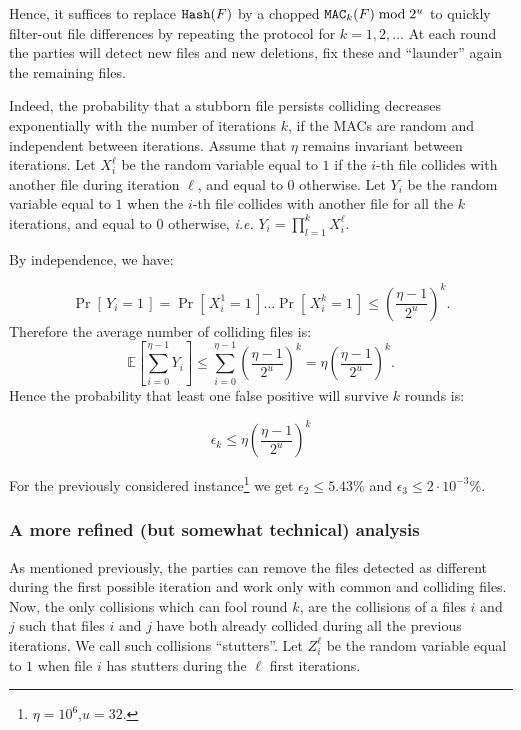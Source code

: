 \documentclass[11pt]{llncs}
\newcommand{\Prob}[1]{{\Pr\left[\,{#1}\,\right]}}
\newcommand{\EE}[1]{{\mathbb{E}\left[{#1}\right]}}
\begin{document}
Hence, it suffices to replace $\mbox{{\tt Hash}}(F)$ by a chopped $\mbox{{\tt MAC}}_k(F) \bmod 2^u$ to quickly filter-out file differences by repeating the protocol for $k=1,2,\ldots$ At each round the parties will detect new files and new deletions, fix these and ``launder'' again the remaining files.\smallskip

Indeed, the probability that a stubborn file persists colliding decreases exponentially with the number of iterations $k$, if the MACs are random and independent between iterations.
Assume that $\eta$ remains invariant between iterations.
Let $X^{\ell}_i$ be the random variable equal to $1$ if the $i$-th file collides with another file during iteration $\ell$, and equal to $0$ otherwise. Let $Y_i$ be the random variable equal to $1$ when the $i$-th file collides with another file for all the $k$ iterations, and equal to $0$ otherwise, {\sl i.e.} $Y_i = \prod_{l=1}^k X^{\ell}_i$.

By independence, we have:

 \[ \Prob{Y_i = 1} = \Prob{X^1_i = 1} \dots \Prob{X^k_i = 1} \le \left( \frac{\eta -1}{2^u} \right)^k. \]
Therefore the average number of colliding files is:
\[
 \EE{\sum_{i=0}^{\eta-1} Y_i} \le \sum_{i=0}^{\eta-1} \left( \frac{\eta -1}{2^u} \right)^k =  \eta \left(\frac{\eta - 1}{2^u}\right)^k.
\]
Hence the probability that least one false positive will survive $k$ rounds is:

\[
\epsilon_k \le \eta \left(\frac{\eta - 1}{2^u}\right)^k
\]

For the previously considered instance\footnote{$\eta=10^6$,$u=32$.} we get $\epsilon_2 \le 5.43\%$ and $\epsilon_3 \le 2 \cdot 10^{-3}\%$.

\subsubsection{A more refined (but somewhat technical) analysis}

As mentioned previously, the parties can remove the files detected as different during the first possible iteration and work only with common and colliding files. Now, the only collisions which can fool round $k$, are the collisions of a files $i$ and $j$ such that files $i$ and $j$ have both already collided during all the previous iterations. We call such collisions ``stutters''. Let $Z^\ell_i$ be the random variable equal to $1$ when file $i$ has stutters during the $\ell$ first iterations.
\end{document}

